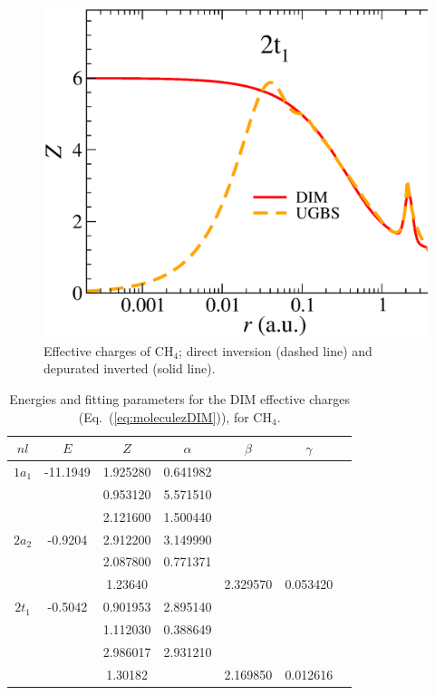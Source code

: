 \documentclass[10pt]{article}
\begin{document}
\begin{figure}[t]
\vspace{0.25cm}
\includegraphics[height=0.23\textheight]{figures/dimpot/zeff_2pCH4.eps}
\caption{Effective charges of CH$_4$; 
direct inversion (dashed line) and depurated inverted (solid line).}
\label{fig:ch4zeff}
\end{figure}

\begin{table}[H]
\centering
\begin{tabular}{cc|ccccc}
\hline
   $nl$ & $E$ &$Z$ & $\alpha$ & $\beta$ & $\gamma$ \\
\hline
   $1a_1$ & -11.1949  & 1.925280 & 0.641982 & & \\
          & & 0.953120 & 5.571510 & & \\
          & & 2.121600 & 1.500440 & & \\
   $2a_2$ & -0.9204 & 2.912200 & 3.149990 & & \\
          & & 2.087800 & 0.771371 & & \\
          & & 1.23640  &          & 2.329570 & 0.053420 \\
   $2t_1$ & -0.5042 & 0.901953 & 2.895140 & & \\
          & & 1.112030 & 0.388649 & & \\
          & & 2.986017 & 2.931210 & & \\
          & & 1.30182  &          & 2.169850 & 0.012616 \\
\hline
\end{tabular}
\caption{Energies and fitting parameters for the DIM effective charges 
(Eq.~(\ref{eq:moleculezDIM})), for CH$_4$.}
\label{tab:ch4parameters}
\end{table}
\end{document}
